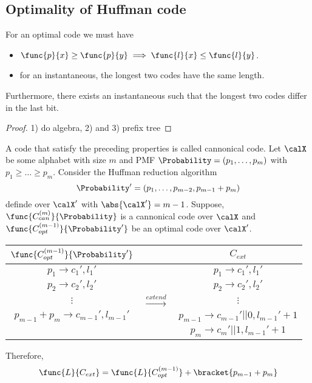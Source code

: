 \subsection{Optimality of Huffman code}
\begin{lemma}
    For an optimal code we must have 
    \begin{itemize}
        \item \(\func{p}{x} \geq \func{p}{y} \implies \func{l}{x} \leq \func{l}{y}\).
        \item for an instantaneous, the longest two codes have the same length.
    \end{itemize}
    Furthermore, there exists an instantaneous such that the longest two codes differ in the last bit.
\end{lemma}
\begin{proof}
    1) do algebra, 2) and  3) prefix tree
\end{proof}
A code that satisfy the preceding properties is called cannonical code. Let \(\calX\) be some alphabet with size \(m\) and PMF \(\Probability = (p_1, \dots ,p_m)\) with \(p_1 \geq \dots \geq p_m\).  Consider the Huffman reduction algorithm
\begin{equation*}
    \Probability' = (p_1, \dots , p_{m-2} , p_{m-1} + p_m)
\end{equation*}
definde over \(\calX'\) with \(\abs{\calX'} = m- 1\). Suppose, \(\func{C^{(m)}_{can}}{\Probability}\) is a cannonical code over \(\calX\) and \(\func{C^{(m-1)}_{opt}}{\Probability'}\) be an optimal code over \(\calX'\). 
\begin{table}
    \centering 
    \begin{tabular}{c|c|c}
        \(\func{C^{(m-1)}_{opt}}{\Probability'}\) & & \(C_{ext}\) \\\hline 
        \(p_1 \to c_1' , l_1'\) & & \(p_1 \to c_1', l_1'\)\\ \hline
         \(p_2 \to c_2' , l_2'\) & & \(p_2 \to c_2', l_2'\)\\ \hline
         \(\vdots\) & \(\xrightarrow{extend}\) & \(\vdots\) \\ \hline
         \(p_{m-1} + p_{m} \to c_{m-1}' , l_{m-1}'\) & & \(p_{m-1} \to c_{m-1}' || 0, l_{m-1}' + 1\)\\ 
         & & \(p_{m} \to c_{m}' || 1, l_{m-1}' + 1\)\\ 
    \end{tabular}
\end{table}
Therefore, 
\begin{equation*}
    \func{L}{C_{ext}} = \func{L}{C^{(m-1)}_{opt}} + \bracket{p_{m-1} + p_m}
\end{equation*}
